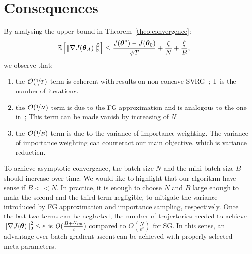 \section{Consequences}\label{sec:consequence}

By analysing the upper-bound in Theorem~\ref{theo:convergence}:
	\begin{align*}
&\EVV[]
{\norm[2]{\nabla J(\vtheta_A)}^2} 
\leq
\frac{J(\vtheta^*)-J(\vtheta_0)}{\psi T} +
\frac{\zeta}{N}
+\frac{\xi}{B},
\end{align*}
 we observe that:
 \begin{enumerate}
 	\item  the $\mathcal{O}(\nicefrac{1}{T})$ term is coherent with results on non-concave SVRG~\citep[\eg][]{reddi2016stochastic}; T is the number of iterations.
 	\item the $\mathcal{O}(\nicefrac{1}{N})$ term is due to the \acs{FG} approximation and is analogous to the one in~\citep{harikandeh2015stopwasting}; This term can be made vanish by increasing of $N$
 	\item the $\mathcal{O}(\nicefrac{1}{B})$ term is due to the variance of importance weighting. The variance of importance weighting can counteract our main objective, which is variance reduction.
 \end{enumerate}
To achieve asymptotic convergence, the batch size $N$ and the mini-batch size $B$ should increase over time.
 We would like to highlight that our algorithm have sense if  $B << N$.\newline
In practice, it is enough to choose $N$ and $B$ large enough to make the second and the third term negligible, \ie to mitigate the variance introduced by \acs{FG} approximation and importance sampling, respectively.
Once the last two terms can be neglected, the number of trajectories needed to achieve $\norm[2]{\gradJ{\vtheta}}^2\leq\epsilon$ is $O(\frac{B+\nicefrac{N}{m}}{\epsilon})$ compared to $O(\frac{N}{\epsilon^2})$ for \acs{SG}. In this sense, an advantage over batch gradient ascent can be achieved with properly selected meta-parameters. 